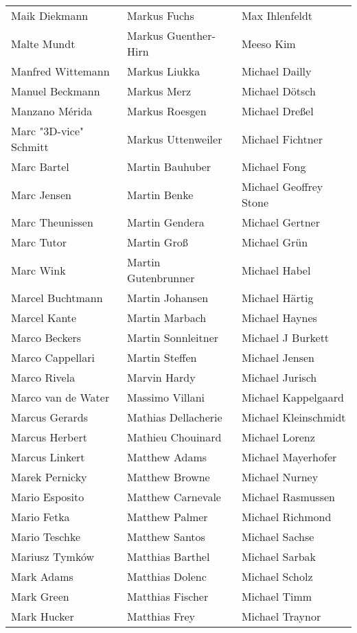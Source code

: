 \begin{tabular}{p{4.5cm}p{4.5cm}p{4.5cm}}
Maik Diekmann & Markus Fuchs & Max Ihlenfeldt \\
Malte Mundt & Markus Guenther-Hirn & Meeso Kim \\
Manfred Wittemann & Markus Liukka & Michael Dailly \\
Manuel Beckmann & Markus Merz & Michael Dötsch \\
Manzano Mérida & Markus Roesgen & Michael Dreßel \\
Marc "3D-vice" Schmitt & Markus Uttenweiler & Michael Fichtner \\
Marc Bartel & Martin Bauhuber & Michael Fong \\
Marc Jensen & Martin Benke & Michael Geoffrey Stone \\
Marc Theunissen & Martin Gendera & Michael Gertner \\
Marc Tutor & Martin Groß & Michael Grün \\
Marc Wink & Martin Gutenbrunner & Michael Habel \\
Marcel Buchtmann & Martin Johansen & Michael Härtig \\
Marcel Kante & Martin Marbach & Michael Haynes \\
Marco Beckers & Martin Sonnleitner & Michael J Burkett \\
Marco Cappellari & Martin Steffen & Michael Jensen \\
Marco Rivela & Marvin Hardy & Michael Jurisch \\
Marco van de Water & Massimo Villani & Michael Kappelgaard \\
Marcus Gerards & Mathias Dellacherie & Michael Kleinschmidt \\
Marcus Herbert & Mathieu Chouinard & Michael Lorenz \\
Marcus Linkert & Matthew Adams & Michael Mayerhofer \\
Marek Pernicky & Matthew Browne & Michael Nurney \\
Mario Esposito & Matthew Carnevale & Michael Rasmussen \\
Mario Fetka & Matthew Palmer & Michael Richmond \\
Mario Teschke & Matthew Santos & Michael Sachse \\
Mariusz Tymków & Matthias Barthel & Michael Sarbak \\
Mark Adams & Matthias Dolenc & Michael Scholz \\
Mark Green & Matthias Fischer & Michael Timm \\
Mark Hucker & Matthias Frey & Michael Traynor \\

\end{tabular}
